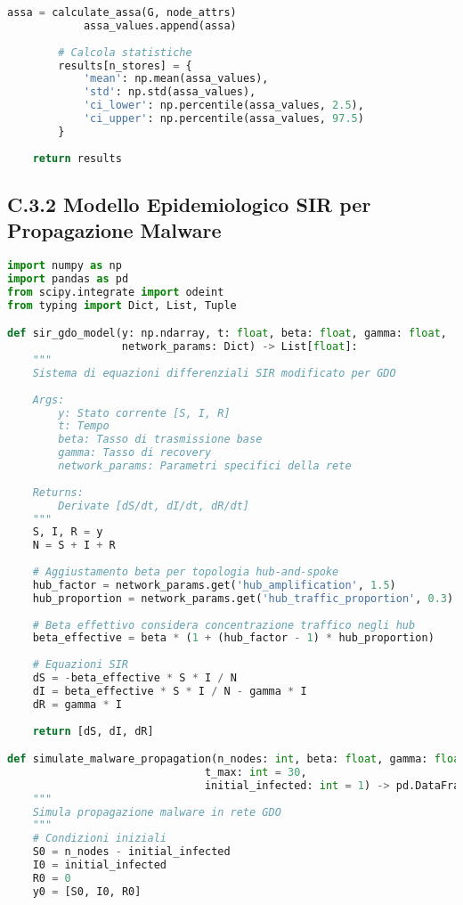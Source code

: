 \begin{lstlisting}[language=Python, caption=Calcolo ASSA per Reti GDO Distribuite]
            assa = calculate_assa(G, node_attrs)
            assa_values.append(assa)
        
        # Calcola statistiche
        results[n_stores] = {
            'mean': np.mean(assa_values),
            'std': np.std(assa_values),
            'ci_lower': np.percentile(assa_values, 2.5),
            'ci_upper': np.percentile(assa_values, 97.5)
        }
    
    return results
\end{lstlisting}

\subsection{C.3.2 Modello Epidemiologico SIR per Propagazione Malware}

\begin{lstlisting}[language=Python, caption=Modello SIR Adattato per Reti GDO]
import numpy as np
import pandas as pd
from scipy.integrate import odeint
from typing import Dict, List, Tuple

def sir_gdo_model(y: np.ndarray, t: float, beta: float, gamma: float, 
                  network_params: Dict) -> List[float]:
    """
    Sistema di equazioni differenziali SIR modificato per GDO
    
    Args:
        y: Stato corrente [S, I, R]
        t: Tempo
        beta: Tasso di trasmissione base
        gamma: Tasso di recovery
        network_params: Parametri specifici della rete
        
    Returns:
        Derivate [dS/dt, dI/dt, dR/dt]
    """
    S, I, R = y
    N = S + I + R
    
    # Aggiustamento beta per topologia hub-and-spoke
    hub_factor = network_params.get('hub_amplification', 1.5)
    hub_proportion = network_params.get('hub_traffic_proportion', 0.3)
    
    # Beta effettivo considera concentrazione traffico negli hub
    beta_effective = beta * (1 + (hub_factor - 1) * hub_proportion)
    
    # Equazioni SIR
    dS = -beta_effective * S * I / N
    dI = beta_effective * S * I / N - gamma * I
    dR = gamma * I
    
    return [dS, dI, dR]

def simulate_malware_propagation(n_nodes: int, beta: float, gamma: float,
                               t_max: int = 30, 
                               initial_infected: int = 1) -> pd.DataFrame:
    """
    Simula propagazione malware in rete GDO
    """
    # Condizioni iniziali
    S0 = n_nodes - initial_infected
    I0 = initial_infected
    R0 = 0
    y0 = [S0, I0, R0]
    

\end{lstlisting}
